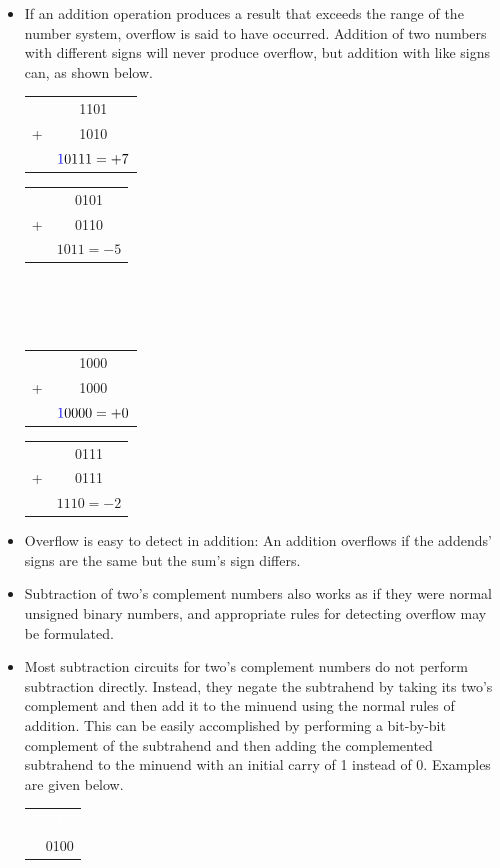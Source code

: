 \documentclass[10pt,a4paper]{article}
\begin{document}
\begin{itemize}
\item If an addition operation produces a result that exceeds the range of the number system, overflow is said to have occurred. Addition of two numbers with different signs will never produce overflow, but addition with like signs can, as shown below.\\
\begin{tabular}{cc}
  & 1101\\
+ & 1010\\
\hline
 & $\textcolor{blue}{1}0111=+7$
\end{tabular}\hspace{.5cm}
\begin{tabular}{cc}
  & 0101\\
+ & 0110\\
\hline
 & $1011=-5$
\end{tabular}\\~\\~\\
\begin{tabular}{cc}
  & 1000\\
+ & 1000\\
\hline
 & $\textcolor{blue}{1}0000=+0$
\end{tabular}\hspace{.5cm}
\begin{tabular}{cc}
  & 0111\\
+ & 0111\\
\hline
 & $1110=-2$
\end{tabular}
\item Overflow is easy to detect in addition: An addition overflows if the addends' signs are the same but the sum's sign differs. 
\item Subtraction of two's complement numbers also works as if they were normal unsigned binary numbers, and appropriate rules for detecting overflow may be formulated.
\item Most subtraction circuits for two's complement numbers do not perform subtraction directly. Instead, they negate the subtrahend by taking its two's complement and then add it to the minuend using the normal rules of addition. This can be easily accomplished by performing a bit-by-bit complement of the subtrahend and then adding the complemented subtrahend to the minuend with an initial carry of 1 instead of 0. Examples are given below.\\
\begin{tabular}{cc}
  & \textcolor{white}{1}\\
  & 0100\\

\end{tabular}
\end{itemize}
\end{document}
